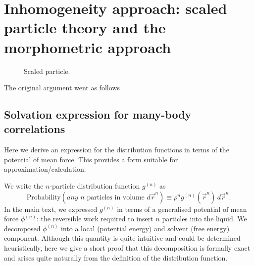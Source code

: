 \documentclass[11pt]{report}
\begin{document}
\section{Inhomogeneity approach: scaled particle theory and the morphometric approach}

\begin{figure}
  \missingfigure[figwidth=\linewidth]{}
  \caption{Scaled particle.}
\end{figure}

The original argument went as follows

\subsection{Solvation expression for many-body correlations}

Here we derive an expression for the distribution functions in terms of the potential of mean force.
This provides a form suitable for approximation/calculation.

We write the $n$-particle distribution function $g^{(n)}$ as
\begin{equation}\label{eq:n-density-pdf}
  \textrm{Probability}\left( \textit{any } n \textrm{ particles in volume } d\vec{r}^n \right)
  \equiv
  \rho^n g^{(n)}(\vec{r}^n) \, d\vec{r}^n.
\end{equation}
In the main text, we expressed $g^{(n)}$ in terms of a generalised potential of mean force $\phi^{(n)}$: the reversible work required to insert $n$ particles into the liquid.
We decomposed $\phi^{(n)}$ into a local (potential energy) and solvent (free energy) component.
Although this quantity is quite intuitive and could be determined heuristically, here we give a short proof that this decomposition is formally exact and arises quite naturally from the definition of the distribution function.
\end{document}
